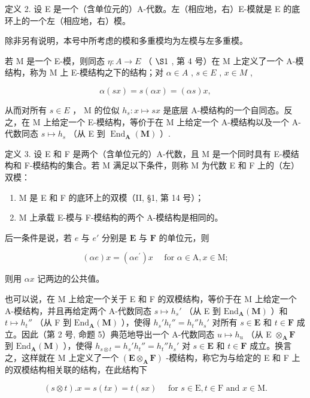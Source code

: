 定义 2. 设 E 是一个（含单位元的）A-代数。左（相应地，右）E-模就是 E 的底环上的一个左（相应地，右）模。

除非另有说明，本号中所考虑的模和多重模均为左模与左多重模。

若 M 是一个 E-模，则同态 \(\eta: A \to E\) （ \(\S 1\) , 第 4 号）在 M 上定义了一个 A-模结构，称为 M 上 E-模结构之下的结构；对 \(\alpha \in A\) , \(s \in E\) , \(x \in M\) ,

\[
\alpha (s x) = s (\alpha x) = (\alpha s) x,\tag{7}
\]

从而对所有 \(s \in E\) ， M 的位似 \(h_{s}: x \mapsto sx\) 是底层 A-模结构的一个自同态。反之，在 M 上给定一个 E-模结构，等价于在 M 上给定一个 A-模结构以及一个 A-代数同态 \(s \mapsto h_{s}\) （从 E 到 \(\operatorname{End}_{\mathbf{A}}(\mathbf{M})\) ）.

定义 3. 设 E 和 F 是两个（含单位元的）A-代数，且 M 是一个同时具有 E-模结构和 F-模结构的集合。若 M 满足以下条件，则称 M 为代数 E 和 F 上的（左）双模：

\begin{enumerate}
\def\labelenumi{(\arabic{enumi})}
\item
  M 是 E 和 F 的底环上的双模（II, §1, 第 14 号）；
\item
  M 上承载 E-模与 F-模结构的两个 A-模结构是相同的。
\end{enumerate}

后一条件是说，若 \(e\) 与 \(e'\) 分别是 \(\mathbf{E}\) 与 \(\mathbf{F}\) 的单位元，则

\[
(\alpha e) x = (\alpha e ^ {\prime}) x \quad \text { for } \alpha \in \mathrm{A}, x \in \mathrm{M};\tag{8}
\]

则用 \(\alpha x\) 记两边的公共值。

也可以说，在 M 上给定一个关于 E 和 F 的双模结构，等价于在 M 上给定一个 A-模结构，并且再给定两个 A-代数同态 \(s \mapsto h_s'\) （从 E 到 \(\mathrm{End}_{\mathbf{A}}(\mathbf{M})\) ）和 \(t \mapsto h_t''\) （从 F 到 \(\mathrm{End}_{\mathbf{A}}(\mathbf{M})\) ），使得 \(h_s'h_t'' = h_t''h_s'\) 对所有 \(s \in \mathbf{E}\) 和 \(t \in \mathbf{F}\) 成立。因此（第 2 号, 命题 5）典范地导出一个 A-代数同态 \(u \mapsto h_u\) （从 E \(\otimes_{\mathbf{A}} \mathbf{F}\) 到 \(\mathrm{End}_{\mathbf{A}}(\mathbf{M})\) ），使得 \(h_{s \otimes t} = h_s'h_t'' = h_t''h_s'\) 对 \(s \in \mathbf{E}\) 和 \(t \in \mathbf{F}\) 成立。换言之，这样就在 M 上定义了一个 \((\mathbf{E} \otimes_{\mathbf{A}} \mathbf{F})\) -模结构，称它为与给定的 E 和 F 上的双模结构相关联的结构，在此结构下

\[
(s \otimes t). x = s (t x) = t (s x) \quad \text { for } s \in \mathrm{E}, t \in \mathrm{F} \text { and } x \in \mathrm{M}.
\]

